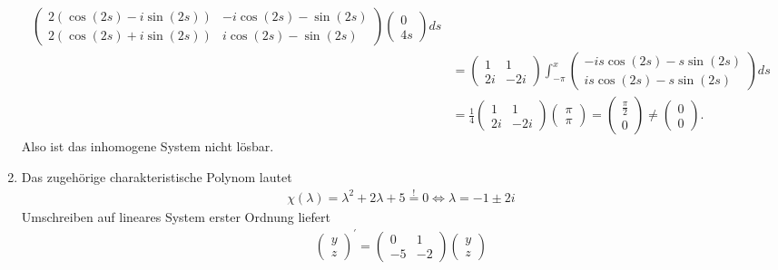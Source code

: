 \begin{solution}
\begin{enumerate}[label = \textbf{\alph*)}]
\begin{align*}
\begin{pmatrix}
      2(\cos(2s) - i\sin(2s)) & -i\cos(2s) - \sin(2s) \\
      2(\cos(2s) + i\sin(2s)) & i\cos(2s) - \sin(2s)
    \end{pmatrix}
    \begin{pmatrix}
      0 \\ 4s
    \end{pmatrix} ds \\
    &= \begin{pmatrix}
      1 & 1 \\ 2i & -2i
    \end{pmatrix}\int_{-\pi}^x
    \begin{pmatrix}
      -is\cos(2s) - s\sin(2s) \\
      is\cos(2s) - s\sin(2s)
    \end{pmatrix}ds \\
    &= \frac{1}{4}\begin{pmatrix}
      1 & 1 \\ 2i & -2i
    \end{pmatrix}
    \begin{pmatrix}
      \pi \\
      \pi
    \end{pmatrix}
    = \begin{pmatrix}
      \frac{\pi}{2} \\ 0
    \end{pmatrix}
    \neq \begin{pmatrix}
      0 \\ 0
    \end{pmatrix}.
  \end{align*}
  Also ist das inhomogene System nicht lösbar.
  \item Das zugehörige charakteristische Polynom lautet
  \begin{align*}
    \chi(\lambda) = \lambda^2 + 2\lambda + 5 \stackrel{!}{=} 0
    \iff \lambda = -1 \pm 2i
  \end{align*}
  Umschreiben auf lineares System erster Ordnung liefert
  \begin{align*}
    \begin{pmatrix}
      y \\ z
    \end{pmatrix}^{\prime}
    = \begin{pmatrix}
      0 & 1 \\
      -5 & -2
    \end{pmatrix}
    \begin{pmatrix}
      y \\ z

\end{pmatrix}
\end{align*}
\end{enumerate}
\end{solution}
